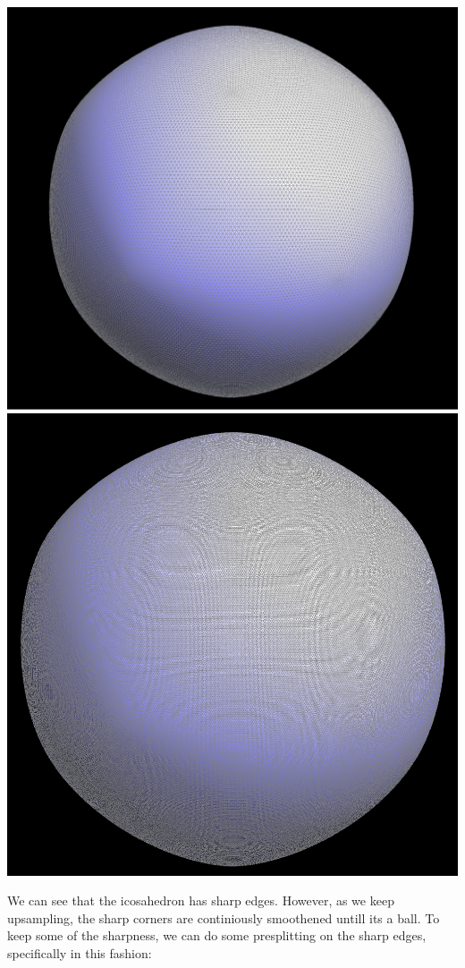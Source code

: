 \documentclass{article}
\begin{document}
\begin{center}
    \includegraphics[]{task 6/iso7.png}
    \includegraphics[]{task 6/iso8.png}
\end{center}
We can see that the icosahedron has sharp edges. However, as we keep upsampling, the sharp corners are continiously smoothened untill its a ball. To keep some of the sharpness, we can do some presplitting on the sharp edges, specifically in this fashion:
\end{document}
